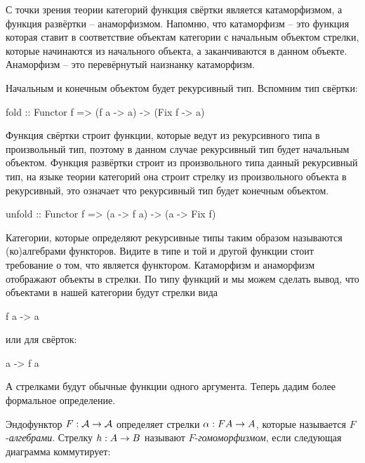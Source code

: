 С точки зрения теории категорий функция свёртки является катаморфизмом,
а функция развёртки -- анаморфизмом. Напомню, что катаморфизм -- это
функция которая ставит в соответствие объектам категории с начальным
объектом стрелки, которые начинаются из начального объекта, а
заканчиваются в данном объекте. Анаморфизм -- это перевёрнутый наизнанку
катаморфизм.

Начальным и конечным объектом будет рекурсивный тип. Вспомним тип
свёртки:


\begin{code}
fold :: Functor f => (f a -> a) -> (Fix f -> a)
\end{code}

Функция свёртки строит функции, которые ведут из рекурсивного типа в
произвольный тип, поэтому в данном случае рекурсивный тип будет
начальным объектом. Функция развёртки строит из произвольного типа
данный рекурсивный тип, на языке теории категорий она строит стрелку из
произвольного объекта в рекурсивный, это означает что рекурсивный тип
будет конечным объектом.


\begin{code}
unfold :: Functor f => (a -> f a) -> (a -> Fix f)
\end{code}

Категории, которые определяют рекурсивные типы таким образом называются
(ко)алгебрами функторов. Видите в типе и той и другой функции стоит
требование о том, что  является функтором. Катаморфизм и
анаморфизм отображают объекты в стрелки. По типу функций  и
 мы можем сделать вывод, что объектами в нашей категории
будут стрелки вида


\begin{code}
f a -> a
\end{code}

или для свёрток:


\begin{code}
a -> f a
\end{code}

А стрелками будут обычные функции одного аргумента. Теперь дадим более
формальное определение.

Эндофунктор $F : \mathcal{A} \rightarrow \mathcal{A}$ определяет стрелки
$\alpha : FA \rightarrow A$, которые называется $F$-\emph{алгебрами}. Стрелку
$h : A \rightarrow B$ называют $F$-\emph{гомоморфизмом}, если следующая
диаграмма коммутирует:

\begin{centering}



\end{centering}

